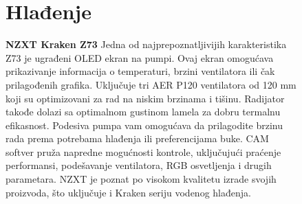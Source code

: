 \documentclass{article}
\begin{document}
\begin{figure}
\section {Hlađenje}
\textbf{NZXT Kraken Z73}
Jedna od najprepoznatljivijih karakteristika Z73 je ugrađeni OLED ekran na pumpi. Ovaj ekran omogućava prikazivanje informacija o temperaturi, brzini ventilatora ili čak prilagođenih grafika.
Uključuje tri AER P120 ventilatora od 120 mm koji su optimizovani za rad na niskim brzinama i tišinu. Radijator takođe dolazi sa optimalnom gustinom lamela za dobru termalnu efikasnost.
Podesiva pumpa vam omogućava da prilagodite brzinu rada prema potrebama hlađenja ili preferencijama buke.
CAM softver pruža napredne mogućnosti kontrole, uključujući praćenje performansi, podešavanje ventilatora, RGB osvetljenja i drugih parametara.
NZXT je poznat po visokom kvalitetu izrade svojih proizvoda, što uključuje i Kraken seriju vodenog hlađenja.

\end{figure}
\end{document}
